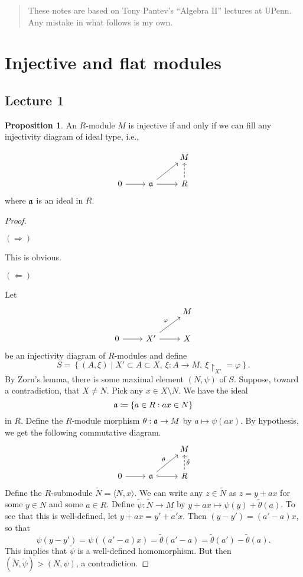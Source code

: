 \documentclass[10pt,letterpaper,cm]{nupset}
\theoremstyle{definition}
\theoremstyle{theorem}
\newtheorem{prop}[definition]{Proposition}
\theoremstyle{remark}
\newcommand{\1}{\mathbf{1}}
\newcommand{\0}{\vec 0}
\begin{document}
\thispagestyle{empty}
\begin{abstract}
These notes are based on Tony Pantev's ``Algebra II'' lectures at UPenn. Any mistake in what follows is my own.
\end{abstract}

\tableofcontents
\newpage

\section{Injective and flat modules}

\subsection{Lecture 1}

\begin{prop} An $R$-module $M$ is injective if and only if we can fill any injectivity diagram of ideal type, i.e.,  

\[
\begin{tikzcd}
 &  & M \\
0 \arrow[r] & \frak{a} \arrow[r] \arrow[ru] & R \arrow[u, dashed]
\end{tikzcd}
\] 
where $\frak{a}$ is an ideal in $R$.
\end{prop}
\begin{proof} $ $
\smallskip

$(\Longrightarrow)$

This is obvious.

\medskip


$(\Longleftarrow)$ 

Let 
\[
\begin{tikzcd}
 &  & M \\
0 \arrow[r] & X' \arrow[ru, "\varphi"] \arrow[r] & X
\end{tikzcd} \] 
be an injectivity diagram of $R$-modules and define $$S = \left\{(A, \xi) \mid X' \subset A \subset X, \ \xi : A \to M, \ \xi \restriction_{X'} = \varphi\right\} . $$ By Zorn's lemma, there is some maximal element $(N, \psi)$ of $S$. Suppose, toward a contradiction, that $X \ne N$. Pick any $x\in X \setminus N$. We have the ideal $$\frak{a} \coloneqq  \left\{a \in R : ax \in N\right\}$$ in $R$. Define the $R$-module morphism $\theta : \frak{a} \to M$ by $a \mapsto \psi(ax)$. By hypothesis, we get the following commutative diagram.
\[
\begin{tikzcd}
 &  & M \\
0 \arrow[r] & \frak{a} \arrow[ru, "\theta"] \arrow[r, hook] & R \arrow[u, "\tilde{\theta}"', dashed]
\end{tikzcd}
\] Define the $R$-submodule $\widetilde{N} = \langle N, x\rangle$. We can write any $z\in \widetilde{N}$ as $z = y + ax$ for some $y\in N$ and some $a\in R$. Define $\tilde{\psi} : \widetilde{N} \to M$ by $y+ax \mapsto \psi(y) + \tilde{\theta}(a)$. To see that this is well-defined, let $y+ax = y'+a'x$. Then $(y-y') = (a'-a)x$, so that $$\psi(y-y') = \psi((a'-a)x) = \tilde{\theta}(a'-a) = \tilde{\theta}(a') - \tilde{\theta}(a) . $$
This implies that $\tilde{\psi}$ is a well-defined homomorphism. But then $\left(\widetilde{N}, \tilde{\psi}\right)> \left(N, \psi\right)$, a contradiction.  
\end{proof}
\end{document}
